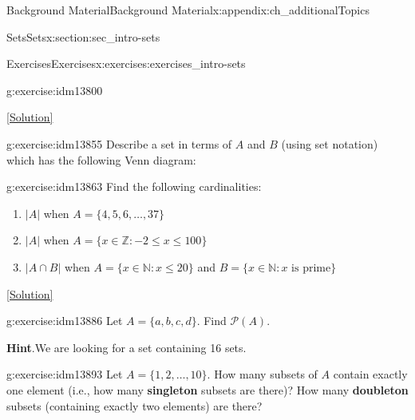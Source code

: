 \documentclass[oneside,10pt,]{book}
\newcommand{\terminology}[1]{\textbf{#1}}
\numberwithin{equation}{chapter}
\def\N{\mathbb N}
\def\Z{\mathbb Z}
\def\pow{\mathcal P}
\def\st{:}
\begin{document}
\begin{appendixptx}{Background Material}{}{Background Material}{}{}{x:appendix:ch_additionalTopics}
\begin{sectionptx}{Sets}{}{Sets}{}{}{x:section:sec_intro-sets}
\begin{exercises-subsection}{Exercises}{}{Exercises}{}{}{x:exercises:exercises_intro-sets}
\begin{divisionexercise}{7}{}{}{g:exercise:idm13800}
\begin{enumerate}[label=(\alph*)]
\end{enumerate}
%
\space\hspace*{0pt}\hfill{\tiny\hyperlink{g:solution:idm13816-main}{[Solution]}}\end{divisionexercise}%
\begin{divisionexercise}{8}{}{}{g:exercise:idm13855}%
Describe a set in terms of \(A\) and \(B\) (using set notation) which has the following Venn diagram:%
\begin{sidebyside}{1}{0.4}{0.4}{0}%
\begin{sbspanel}{0.2}%
%
\end{sbspanel}%
\end{sidebyside}%
\end{divisionexercise}%
\begin{divisionexercise}{9}{}{}{g:exercise:idm13863}%
Find the following cardinalities:%
\begin{enumerate}[label=(\alph*)]
\item{}\(|A|\) when \(A = \{4,5,6,\ldots,37\}\)%
\item{}\(|A|\) when \(A = \{x \in \Z \st -2 \le x \le 100\}\)%
\item{}\(|A \cap B|\) when \(A = \{x \in \N \st x \le 20\}\) and \(B = \{x \in \N \st x \mbox{ is prime} \}\)%
\end{enumerate}
%
\space\hspace*{0pt}\hfill{\tiny\hyperlink{g:solution:idm13877-main}{[Solution]}}\end{divisionexercise}%
\begin{divisionexercise}{10}{}{}{g:exercise:idm13886}%
Let \(A = \{a, b, c, d\}\). Find \(\pow(A)\).%
\par\smallskip%
\noindent\textbf{Hint}.\hypertarget{g:hint:idm13891}{}\quad{}We are looking for a set containing 16 sets.%
\end{divisionexercise}%
\begin{divisionexercise}{11}{}{}{g:exercise:idm13893}%
Let \(A = \{1,2,\ldots, 10\}\). How many subsets of \(A\) contain exactly one element (i.e., how many \terminology{singleton} subsets are there)? How many \terminology{doubleton} subsets (containing exactly two elements) are there?%

\end{divisionexercise}
\end{exercises-subsection}
\end{sectionptx}
\end{appendixptx}
\end{document}
